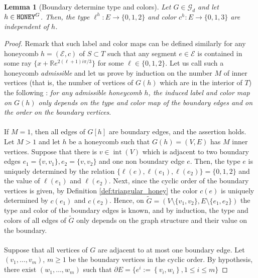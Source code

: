 \documentclass[11pt,a4paper]{amsart}
\providecommand{\honey}{\texttt{\textsc{HONEY}}}
\DeclareMathOperator{\interior}{int}
\numberwithin{equation}{section}
\newtheorem{lemma}[theorem]{Lemma}
\theoremstyle{definition}
\begin{document}
\begin{lemma}[Boundary determine type and colors]
    \label{lem:types_colors_determined_by_boundaries}
    Let $G\in\mathcal{G}_d$ and let $h\in \honey^G$. 
    Then, the type $\ell^h:E\rightarrow \{0,1,2\}$ 
    and color $c^h:E\rightarrow \{0,1,3\}$ are independent of $h$.
\end{lemma}

\begin{proof}
    Remark that such label and color maps can be defined similarly for any honeycomb $h=(\mathcal{E},c)$ of $S\subset T$ such 
    that any segment $e\in \mathcal{E}$ is contained in some ray $\{x+\mathbb{R}e^{2(\ell+1)i \pi/3}\}$ 
    for some $\ell\in\{0,1,2\}$. 
    Let us call such a honeycomb \textit{admissible} and let us prove by 
    induction on the number $M$ 
    of inner vertices (that is, the number of vertices of $G(h)$ which are in the interior of $T$) the following : 
    \textit{for any admissible honeycomb $h$, the induced label and color map on $G(h)$ 
    only depends on the type and color map of the boundary edges and on the 
    order on the boundary vertices}.
    \\
    \\
    If $M=1$, then all edges of $G[h]$ are boundary edges, and the assertion holds. 
    Let $M>1$ and let $h$ be a honeycomb such that $G(h)=(V,E)$ has $M$ inner vertices. Suppose that there is $v\in \interior (V)$ which is adjacent to two boundary edges 
    $e_1=\{v,v_1\},e_2=\{v,v_2\}$ and one non boundary edge $e$. 
    Then, the type $e$ is uniquely determined by the relation 
    $\{\ell(e),\ell(e_1),\ell(e_2)\}=\{0,1,2\}$ 
    and the value of $\ell(e_1)$ and $\ell(e_2)$. 
    Next, since the cyclic order of the boundary vertices is given, 
    by Definition \ref{def:triangular_honey} the color $c(e)$ is uniquely determined 
    by $c(e_1)$ and $c(e_2)$. Hence, on $\tilde{G}=(V\setminus \{v_1,v_2\}, 
    E\setminus \{e_1,e_2\})$ 
    the type and color of the boundary edges is known, and by induction, 
    the type and colors of all edges of $\tilde{G}$ only depends on the graph 
    structure and their value on the boundary. 
    \\
    \\
    Suppose that all vertices of $G$ are adjacent to at most one boundary edge. 
    Let $(v_1,\ldots, v_m)$, $m\geqslant 1$ be the boundary vertices in the cyclic order. 
    By hypothesis, there exist $(w_1,\ldots,w_m)$ such that 
    $\partial E=\{ e^i := \left\{v_i,w_i\right\} ,1\leqslant i\leqslant m\}$ 

\end{proof}
\end{document}
